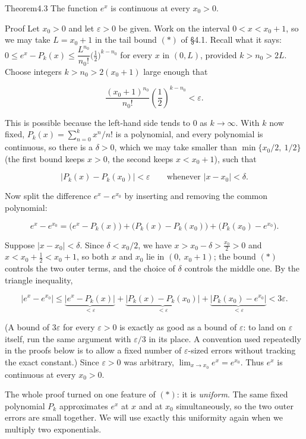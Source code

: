 \documentclass[a4paper,12pt,oneside]{memoir}
\begin{document}
\begin{envtheorem}{Theorem}{4.3}{}
The function \(e^{x}\) is continuous at every \(x_{0} > 0\).
\end{envtheorem}
\begin{envproof}{Proof}{}{}
Let \(x_{0} > 0\) and let \(\varepsilon > 0\) be given. Work on the interval \(0 < x < x_{0} + 1\), so we may take \(L = x_{0} + 1\) in the tail bound \((*)\) of §4.1. Recall what it says: \(0 \le e^{x} - P_{k}(x) \le \dfrac{L^{n_{0}}}{n_{0}!}\bigl(\tfrac{1}{2}\bigr)^{k - n_{0}}\) for every \(x\) in \((0, L)\), provided \(k > n_{0} > 2L\). Choose integers \(k > n_{0} > 2(x_{0} + 1)\) large enough that

\[ \frac{(x_{0} + 1)^{n_{0}}}{n_{0}!} \left(\frac{1}{2}\right)^{k - n_{0}} < \varepsilon. \]

This is possible because the left-hand side tends to \(0\) as \(k \to \infty\). With \(k\) now fixed, \(P_{k}(x) = \sum_{n=0}^{k} x^{n}/n!\) is a polynomial, and every polynomial is continuous, so there is a \(\delta > 0\), which we may take smaller than \(\min\{x_{0}/2,\ 1/2\}\) (the first bound keeps \(x > 0\), the second keeps \(x < x_{0} + 1\)), such that

\[ \lvert P_{k}(x) - P_{k}(x_{0}) \rvert < \varepsilon \qquad \text{whenever } \lvert x - x_{0} \rvert < \delta. \]

Now split the difference \(e^{x} - e^{x_{0}}\) by inserting and removing the common polynomial:

\[ e^{x} - e^{x_{0}} = \bigl(e^{x} - P_{k}(x)\bigr) + \bigl(P_{k}(x) - P_{k}(x_{0})\bigr) + \bigl(P_{k}(x_{0}) - e^{x_{0}}\bigr). \]

Suppose \(\lvert x - x_{0} \rvert < \delta\). Since \(\delta < x_{0}/2\), we have \(x > x_{0} - \delta > \tfrac{x_{0}}{2} > 0\) and \(x < x_{0} + \tfrac{1}{2} < x_{0} + 1\), so both \(x\) and \(x_{0}\) lie in \((0,\ x_{0} + 1)\); the bound \((*)\) controls the two outer terms, and the choice of \(\delta\) controls the middle one. By the triangle inequality,

\[ \lvert e^{x} - e^{x_{0}} \rvert \le \underbrace{\lvert e^{x} - P_{k}(x) \rvert}_{< \varepsilon} + \underbrace{\lvert P_{k}(x) - P_{k}(x_{0}) \rvert}_{< \varepsilon} + \underbrace{\lvert P_{k}(x_{0}) - e^{x_{0}} \rvert}_{< \varepsilon} < 3\varepsilon. \]

(A bound of \(3\varepsilon\) for every \(\varepsilon > 0\) is exactly as good as a bound of \(\varepsilon\): to land on \(\varepsilon\) itself, run the same argument with \(\varepsilon/3\) in its place. A convention used repeatedly in the proofs below is to allow a fixed number of \(\varepsilon\)-sized errors without tracking the exact constant.) Since \(\varepsilon > 0\) was arbitrary, \(\lim_{x \to x_{0}} e^{x} = e^{x_{0}}\). Thus \(e^{x}\) is continuous at every \(x_{0} > 0\). \qedmark
\end{envproof}
The whole proof turned on one feature of \((*)\): it is \emph{uniform}. The same fixed polynomial \(P_{k}\) approximates \(e^{x}\) at \(x\) and at \(x_{0}\) simultaneously, so the two outer errors are small together. We will use exactly this uniformity again when we multiply two exponentials.
\end{document}
